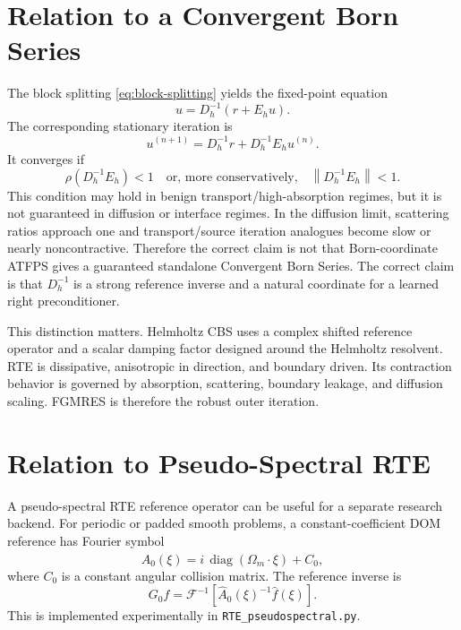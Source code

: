 \documentclass[11pt]{article}
\newcommand{\norm}[1]{\left\lVert #1 \right\rVert}
\begin{document}
\section{Relation to a Convergent Born Series}

The block splitting \eqref{eq:block-splitting} yields the fixed-point equation
\begin{equation}
  u = D_h^{-1}(r + E_h u).
\end{equation}
The corresponding stationary iteration is
\begin{equation}
  u^{(n+1)} = D_h^{-1}r + D_h^{-1}E_h u^{(n)}.
  \label{eq:block-born-iteration}
\end{equation}
It converges if
\begin{equation}
  \rho(D_h^{-1}E_h) < 1
  \quad\text{or, more conservatively,}\quad
  \norm{D_h^{-1}E_h}<1.
  \label{eq:contraction}
\end{equation}
This condition may hold in benign transport/high-absorption regimes, but it is
not guaranteed in diffusion or interface regimes.  In the diffusion limit,
scattering ratios approach one and transport/source iteration analogues become
slow or nearly noncontractive.  Therefore the correct claim is not that
Born-coordinate ATFPS gives a guaranteed standalone Convergent Born Series.
The correct claim is that \(D_h^{-1}\) is a strong reference inverse and a
natural coordinate for a learned right preconditioner.

This distinction matters.  Helmholtz CBS uses a complex shifted reference
operator and a scalar damping factor designed around the Helmholtz resolvent.
RTE is dissipative, anisotropic in direction, and boundary driven.  Its
contraction behavior is governed by absorption, scattering, boundary leakage,
and diffusion scaling.  FGMRES is therefore the robust outer iteration.

\section{Relation to Pseudo-Spectral RTE}

A pseudo-spectral RTE reference operator can be useful for a separate research
backend.  For periodic or padded smooth problems, a constant-coefficient DOM
reference has Fourier symbol
\begin{equation}
  \widehat A_0(\xi)
  =
  i\,\operatorname{diag}(\Omega_m\cdot \xi)
  +
  C_0,
  \label{eq:pseudospectral-symbol}
\end{equation}
where \(C_0\) is a constant angular collision matrix.  The reference inverse is
\begin{equation}
  G_0 f =
  \mathcal{F}^{-1}
  \left[
    \widehat A_0(\xi)^{-1}\widehat f(\xi)
  \right].
  \label{eq:fft-green}
\end{equation}
This is implemented experimentally in \texttt{RTE\_pseudospectral.py}.
\end{document}

